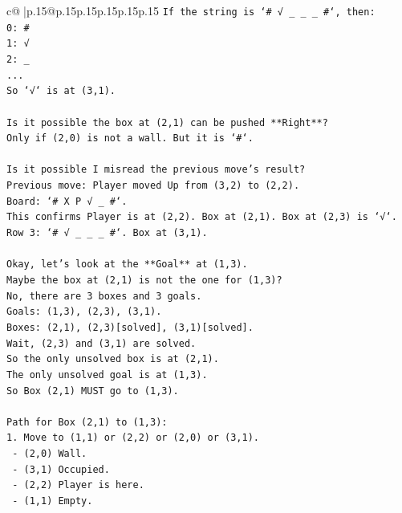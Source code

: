 \documentclass{article}
\begin{document}
{\begin{supertabular}{c@{$\;$}|p{.15\linewidth}@{}p{.15\linewidth}p{.15\linewidth}p{.15\linewidth}p{.15\linewidth}p{.15\linewidth}}
{{{\texttt{If the string is `\# √ \_ \_ \_ \#`, then:} \\
\texttt{0: \#} \\
\texttt{1: √} \\
\texttt{2: \_} \\
\texttt{...} \\
\texttt{So `√` is at (3,1).} \\
\\ 
\texttt{Is it possible the box at (2,1) can be pushed **Right**?} \\
\texttt{Only if (2,0) is not a wall. But it is `\#`.} \\
\\ 
\texttt{Is it possible I misread the previous move's result?} \\
\texttt{Previous move: Player moved Up from (3,2) to (2,2).} \\
\texttt{Board: `\# X P √ \_ \#`.} \\
\texttt{This confirms Player is at (2,2). Box at (2,1). Box at (2,3) is `√`.} \\
\texttt{Row 3: `\# √ \_ \_ \_ \#`. Box at (3,1).} \\
\\ 
\texttt{Okay, let's look at the **Goal** at (1,3).} \\
\texttt{Maybe the box at (2,1) is not the one for (1,3)?} \\
\texttt{No, there are 3 boxes and 3 goals.} \\
\texttt{Goals: (1,3), (2,3), (3,1).} \\
\texttt{Boxes: (2,1), (2,3){[}solved{]}, (3,1){[}solved{]}.} \\
\texttt{Wait, (2,3) and (3,1) are solved.} \\
\texttt{So the only unsolved box is at (2,1).} \\
\texttt{The only unsolved goal is at (1,3).} \\
\texttt{So Box (2,1) MUST go to (1,3).} \\
\\ 
\texttt{Path for Box (2,1) to (1,3):} \\
\texttt{1. Move to (1,1) or (2,2) or (2,0) or (3,1).} \\
\texttt{   {-} (2,0) Wall.} \\
\texttt{   {-} (3,1) Occupied.} \\
\texttt{   {-} (2,2) Player is here.} \\
\texttt{   {-} (1,1) Empty.} \\
\\ 
}}}
\end{supertabular}}
\end{document}
